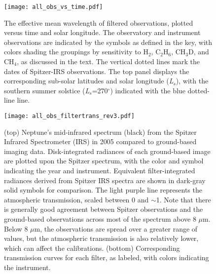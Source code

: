 \documentclass[twocolumn,10pt]{aastex631}
\begin{document}
\begin{figure}
 \centering
    \texttt{[image: all\_obs\_vs\_time.pdf]}
    \caption{The effective mean wavelength of filtered observations, plotted versus time and solar longitude. The observatory and instrument observations are indicated by the symbols as defined in the key, with colors shading the groupings by sensitivity to H$_2$, C$_2$H$_6$, CH$_3$D, and CH$_4$, as discussed in the text. The vertical dotted lines mark the dates of Spitzer-IRS observations. The top panel displays the corresponding sub-solar latitudes and solar longitude (\textit{L$_s$}), with the southern summer solstice (\textit{L$_s$}=270$^{\circ}$) indicated with the blue dotted-line line.}
        \label{fig:allobslamfig}
\end{figure}

\begin{figure*}
 \centering
    \texttt{[image: all\_obs\_filtertrans\_rev3.pdf]}
    \caption{(top) Neptune's mid-infrared spectrum (black) from the Spitzer Infrared Spectrometer (IRS) in 2005 compared to ground-based imaging data. Disk-integrated radiances of each ground-based image are plotted upon the Spitzer spectrum, with the color and symbol indicating the year and instrument. Equivalent filter-integrated radiances derived from Spitzer IRS spectra are shown in dark-gray solid symbols for comparison. The light purple line represents the atmospheric transmission, scaled between 0 and $\sim$1. Note that there is generally good agreement between Spitzer observations and the ground-based observations across most of the spectrum above 8 $\mu$m. Below 8 $\mu$m,  the observations are spread over a greater range of values, but the atmospheric transmission is also relatively lower, which can affect the calibrations. (bottom) Corresponding transmission curves for each filter, as labeled, with colors indicating the instrument.
        \label{fig:filters}}
\end{figure*}
\end{document}
